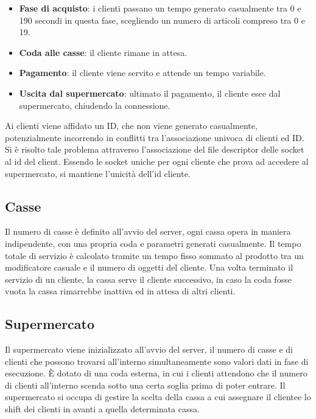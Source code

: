 \documentclass[a4paper, 12pt]{article}
\begin{document}
\begin{itemize}[noitemsep,topsep=0pt,parsep=0pt,partopsep=0pt]
    \item \textbf{Fase di acquisto}: i clienti passano un tempo generato casualmente
        tra 0 e 190 secondi in questa fase, scegliendo un numero di articoli compreso
        tra 0 e 19.
    \item \textbf{Coda alle casse}: il cliente rimane in attesa.
    \item \textbf{Pagamento}: il cliente viene servito e attende un tempo
        variabile.
    \item \textbf{Uscita dal supermercato}: ultimato il pagamento, il cliente esce dal
        supermercato, chiudendo la connessione.

\end{itemize}

Ai clienti viene affidato un ID, che non viene generato casualmente, potenzialmente incorrendo in conflitti tra l'associazione univoca di clienti ed ID. Si è risolto tale problema attraverso l'associazione del file  descriptor delle socket al id del client. Essendo le socket uniche per ogni cliente che prova ad accedere al supermercato, si mantiene l'unicità dell'id cliente.


\subsection{Casse}
Il numero di casse è definito all'avvio del server, ogni cassa opera in 
maniera indipendente, con una propria coda e parametri generati casualmente.
Il tempo totale di servizio è calcolato tramite un tempo fisso sommato al prodotto tra
un modificatore casuale e il numero di oggetti del cliente.
Una volta terminato il servizio di un cliente, la cassa serve il cliente successivo,
in caso la coda fosse vuota la cassa rimarrebbe inattiva ed in attesa di altri clienti.

\newpage

\subsection{Supermercato}
Il supermercato viene inizializzato all'avvio del server, il numero di casse e di clienti
che possono trovarsi all'interno simultaneamente sono valori dati in fase di esecuzione.
È dotato di una coda esterna, in cui i clienti attendono che il numero di clienti all'interno
scenda sotto una certa soglia prima di poter entrare.
Il supermercato si occupa di gestire la scelta della cassa a cui assegnare il clientee  lo shift
dei clienti in avanti a quella determinata cassa.
\end{document}
